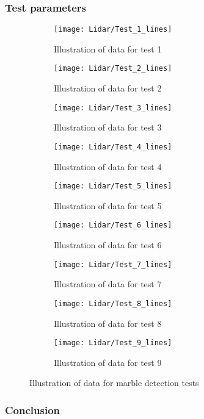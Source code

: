 \documentclass[../Head/Main.tex]{subfiles}
\begin{document}
\subsubsection{Test parameters}
\begin{figure}[H]
  \begin{subfigure}[b]{0.3\textwidth}
  	\centering
    \texttt{[image: Lidar/Test\_1\_lines]}
    \caption{Illustration of data for test 1}
    \label{fig:Linestest1}
  \end{subfigure}
  \hfill
  \begin{subfigure}[b]{0.3\textwidth}
  	\centering
    \texttt{[image: Lidar/Test\_2\_lines]}
    \caption{Illustration of data for test 2}
    \label{fig:Linestest2}
  \end{subfigure}
  \hfill
  \begin{subfigure}[b]{0.3\textwidth}
    \centering
    \texttt{[image: Lidar/Test\_3\_lines]}
    \caption{Illustration of data for test 3}
    \label{fig:Linestest3}
  \end{subfigure}
  \hfill
  \begin{subfigure}[b]{0.3\textwidth}
    \centering
    \texttt{[image: Lidar/Test\_4\_lines]}
    \caption{Illustration of data for test 4}
    \label{fig:Linestest4}
  \end{subfigure}
  \hfill
  \begin{subfigure}[b]{0.3\textwidth}
    \centering
    \texttt{[image: Lidar/Test\_5\_lines]}
    \caption{Illustration of data for test 5}
    \label{fig:Linestest5}
  \end{subfigure}
  \hfill
  \begin{subfigure}[b]{0.3\textwidth}
    \centering
    \texttt{[image: Lidar/Test\_6\_lines]}
    \caption{Illustration of data for test 6}
    \label{fig:Linestest6}
  \end{subfigure}
  \hfill
  \begin{subfigure}[b]{0.3\textwidth}
    \centering
    \texttt{[image: Lidar/Test\_7\_lines]}
    \caption{Illustration of data for test 7}
    \label{fig:Linestest7}
  \end{subfigure}
  \hfill
  \begin{subfigure}[b]{0.3\textwidth}
    \centering
    \texttt{[image: Lidar/Test\_8\_lines]}
    \caption{Illustration of data for test 8}
    \label{fig:Linestest8}
  \end{subfigure}
  \hfill
  \begin{subfigure}[b]{0.3\textwidth}
    \centering
    \texttt{[image: Lidar/Test\_9\_lines]}
    \caption{Illustration of data for test 9}
    \label{fig:Linestest9}
  \end{subfigure}
  \caption{Illustration of data for marble detection tests}
  \label{fig:Linestests}
\end{figure}

\subsubsection{Conclusion}
\end{document}
